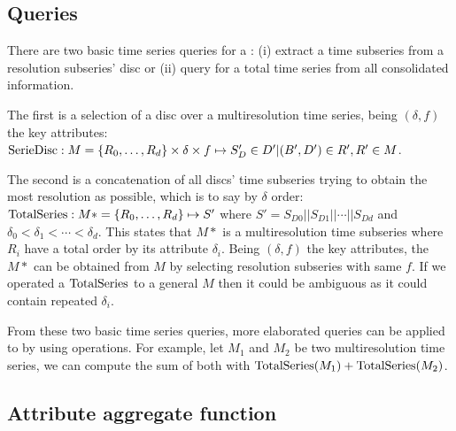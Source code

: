 




\subsection{Queries}


There are two basic time series queries for a : (i) extract a
time subseries from a resolution subseries' disc or (ii) query for a
total time series from all consolidated information.

The first is a selection of a disc over a multiresolution time series,
being $(\delta,f)$ the key attributes: $\operatorname{SerieDisc}: M=\{R_0, \dots,
R_d\} \times \delta \times f \mapsto S'_D \in D' | (B',D') \in R',R' \in
M$.

The second is a concatenation of all discs' time subseries trying to
obtain the most resolution as possible, which is to say by $\delta$
order: $\operatorname{TotalSeries}: M*=\{R_0, \dots, R_d\} \mapsto S'$ where $S' =
S_{D0} || S_{D1} || \cdots || S_{Dd}$ and $\delta_0 < \delta_1 <
\cdots < \delta_d$. This states that $M*$ is a multiresolution time
subseries where $R_i$ have a total order by its attribute
$\delta_i$. Being $(\delta,f)$ the key attributes, the $M*$ can
be obtained from $M$ by selecting resolution subseries with same $f$. If we
operated a $\operatorname{TotalSeries}$ to a general $M$ then it could be ambiguous
as it could contain repeated $\delta_i$.


From these two basic time series queries, more elaborated queries can
be applied to  by using  operations. For
example, let $M_1$ and $M_2$ be two multiresolution time series, we
can compute the sum of both with $\operatorname{TotalSeries}(M_1) +
\operatorname{TotalSeries}(M_2)$.





\subsection{Attribute aggregate function}
\label{sec:model:interpolador}

